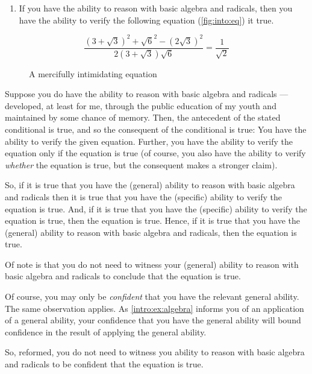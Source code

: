\begin{note}
  \begin{enumerate}[label=(E\arabic*), ref=(E\arabic*), series=i_ex]
  \item\label{intro:ex:algebra} If you have the ability to reason with basic algebra and radicals, then you have the ability to verify the following equation (\autoref{fig:into:eq}) it true.
  \end{enumerate}

  \begin{figure}[H]
    \[\frac{(3 + \sqrt{3})^{2} + \sqrt{6}^{2} - (2\sqrt{3})^{2}}{2(3 + \sqrt{3})\sqrt{6}} = \frac{1}{\sqrt{2}}\]
    \caption{A mercifully intimidating equation}
    \label{fig:into:eq}
  \end{figure}

  Suppose you do have the ability to reason with basic algebra and radicals --- developed, at least for me, through the public education of my youth and maintained by some chance of memory.
  Then, the antecedent of the stated conditional is true, and so the consequent of the conditional is true:
  You have the ability to verify the given equation.
  Further, you have the ability to verify the equation only if the equation is true (of course, you also have the ability to verify \emph{whether} the equation is true, but the consequent makes a stronger claim).

  So, if it is true that you have the (general) ability to reason with basic algebra and radicals then it is true that you have the (specific) ability to verify the equation is true.
  And, if it is true that you have the (specific) ability to verify the equation is true, then the equation is true.
  Hence, if it is true that you have the (general) ability to reason with basic algebra and radicals, then the equation is true.

  Of note is that you do not need to witness your (general) ability to reason with basic algebra and radicals to conclude that the equation is true.

  Of course, you may only be \emph{confident} that you have the relevant general ability.
  The same observation applies.
  As \ref{intro:ex:algebra} informs you of an application of a general ability, your confidence that you have the general ability will bound confidence in the result of applying the general ability.

  So, reformed, you do not need to witness you ability to reason with basic algebra and radicals to be confident that the equation is true.
\end{note}

